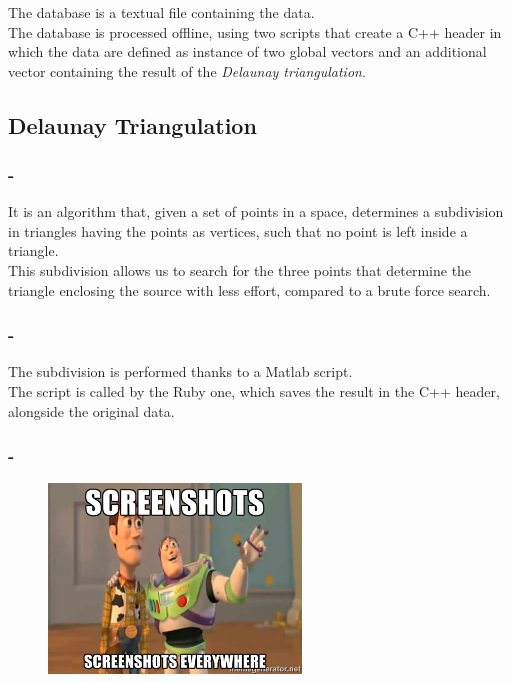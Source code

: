 \documentclass{beamer}
\begin{document}
	\begin{frame}
		\frametitle{\insertsection}
		The database is a textual file containing the data.\\
		The database is processed offline, using two scripts that create a C++ header in which the data
		are defined as instance of two global vectors and an additional vector containing the result
		of the {\em Delaunay triangulation}.\\
	\end{frame}

	\subsection{Delaunay Triangulation}

	\begin{frame}
		\frametitle{\insertsection - \insertsubsection}
		It is an algorithm that, given a set of points in a space, determines a subdivision in triangles
		having the points as vertices, such that no point is left inside a triangle.\\
		This subdivision allows us to search for the three points that determine the triangle enclosing the
		source with less effort, compared to a brute force search.\\
	\end{frame}

	\begin{frame}
		\frametitle{\insertsection - \insertsubsection}
		The subdivision is performed thanks to a Matlab script.\\
		The script is called by the Ruby one, which saves the result in the C++ header, alongside
		the original data.\\
	\end{frame}

	\begin{frame}
		\frametitle{\insertsection - \insertsubsection}
		\begin{figure}
			\centering
			  \includegraphics[width=0.6\textwidth]{images/marine.jpg}
		\end{figure}
	\end{frame}
\end{document}
